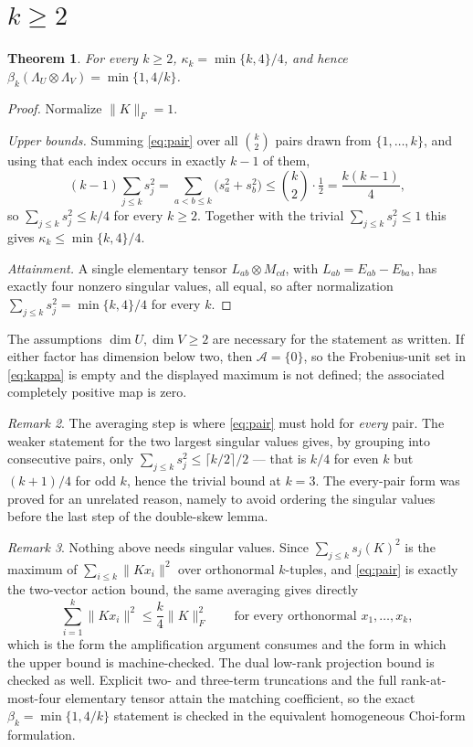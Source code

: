 \documentclass[11pt,reqno]{amsart}
\theoremstyle{plain}
\newtheorem{theorem}{Theorem}[section]
\theoremstyle{remark}
\newtheorem{remark}[theorem]{Remark}
\newcommand{\norm}[1]{\lVert #1\rVert}
\begin{document}
\section{\texorpdfstring{$k\ge2$}{k >= 2}}

\begin{theorem}
\label{thm:kappa}
For every $k\ge2$, $\kappa_k=\min\{k,4\}/4$, and hence
$\beta_k(\Lambda_U\otimes\Lambda_V)=\min\{1,4/k\}$.
\end{theorem}

\begin{proof}
Normalize $\norm K_F=1$.

\emph{Upper bounds.}  Summing \cref{eq:pair} over all $\binom k2$ pairs drawn
from $\{1,\ldots,k\}$, and using that each index occurs in exactly $k-1$ of
them,
\[
    (k-1)\sum_{j\le k}s_j^2
    =\sum_{a<b\le k}\bigl(s_a^2+s_b^2\bigr)
    \le\binom k2\cdot\tfrac12
    =\frac{k(k-1)}4 ,
\]
so $\sum_{j\le k}s_j^2\le k/4$ for every $k\ge2$.  Together with the trivial
$\sum_{j\le k}s_j^2\le1$ this gives $\kappa_k\le\min\{k,4\}/4$.

\emph{Attainment.}  A single elementary tensor $L_{ab}\otimes M_{cd}$, with
$L_{ab}=E_{ab}-E_{ba}$, has exactly four nonzero singular values, all equal, so
after normalization $\sum_{j\le k}s_j^2=\min\{k,4\}/4$ for every $k$.
\end{proof}

The assumptions $\dim U,\dim V\ge2$ are necessary for the statement as
written.  If either factor has dimension below two, then
$\mathcal A=\{0\}$, so the Frobenius-unit set in \cref{eq:kappa} is empty and
the displayed maximum is not defined; the associated completely positive map
is zero.

\begin{remark}
\label{rem:everypair}
The averaging step is where \cref{eq:pair} must hold for \emph{every} pair.  The
weaker statement for the two largest singular values gives, by grouping into
consecutive pairs, only $\sum_{j\le k}s_j^2\le\lceil k/2\rceil/2$ --- that is
$k/4$ for even $k$ but $(k+1)/4$ for odd $k$, hence the trivial bound at $k=3$.
The every-pair form was proved for an unrelated reason, namely to avoid ordering
the singular values before the last step of the double-skew lemma.
\end{remark}

\begin{remark}
\label{rem:action}
Nothing above needs singular values.  Since $\sum_{j\le k}s_j(K)^2$ is the
maximum of $\sum_{i\le k}\norm{Kx_i}^2$ over orthonormal $k$-tuples, and
\cref{eq:pair} is exactly the two-vector action bound, the same averaging gives
directly
\[
    \sum_{i=1}^k\norm{Kx_i}^2\le\frac k4\norm K_F^2
    \qquad\text{for every orthonormal }x_1,\ldots,x_k ,
\]
which is the form the amplification argument consumes and the form in which the
upper bound is machine-checked.  The dual low-rank projection bound is checked
as well.  Explicit two- and three-term truncations and the full rank-at-most-four
elementary tensor attain the matching coefficient, so the exact
$\beta_k=\min\{1,4/k\}$ statement is checked in the equivalent homogeneous
Choi-form formulation.
\end{remark}
\end{document}
